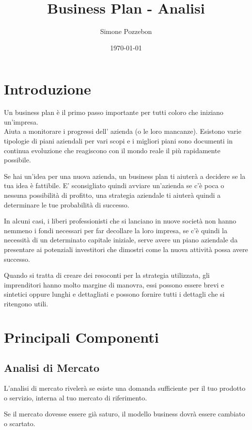 \documentclass[a4paper, 12pt]{article}
\title{Business Plan - Analisi}
\author{Simone Pozzebon}
\date{\today}
\begin{document}
    \maketitle
    \tableofcontents
    \newpage    
    
    \section{Introduzione}
        Un business plan è il primo passo importante per tutti coloro che iniziano un'impresa. \\
        Aiuta a monitorare i progressi dell' azienda (o le loro mancanze). Esistono varie tipologie di piani aziendali per vari scopi e i migliori piani sono documenti in continua evoluzione che reagiscono con il mondo reale il più rapidamente possibile. 
        
        Se hai un'idea per una nuova azienda, un business plan ti aiuterà a decidere se la tua idea è fattibile.
        E’ sconsigliato quindi avviare un'azienda se c'è poca o nessuna possibilità di profitto,  una strategia aziendale ti aiuterà quindi a determinare le tue probabilità di successo.
        
        In alcuni casi, i liberi professionisti che si lanciano in nuove società non hanno nemmeno i  fondi necessari per far decollare la loro impresa, se c'è quindi la necessità di un determinato capitale iniziale, serve avere un piano aziendale da presentare ai potenziali investitori che dimostri come la nuova attività possa  avere successo. 
        
        Quando si tratta di creare dei resoconti per  la strategia utilizzata, gli imprenditori hanno molto margine di manovra, essi possono essere brevi e sintetici oppure lunghi e dettagliati e possono fornire tutti i dettagli che si ritengono utili.
        
    \section{Principali Componenti}
        \subsection{Analisi di Mercato}
            L'analisi di mercato rivelerà se esiste una domanda sufficiente per il tuo prodotto o servizio, interna al tuo mercato di riferimento.
            
            Se il mercato dovesse essere già saturo, il modello business dovrà essere cambiato o scartato.
        
\end{document}
